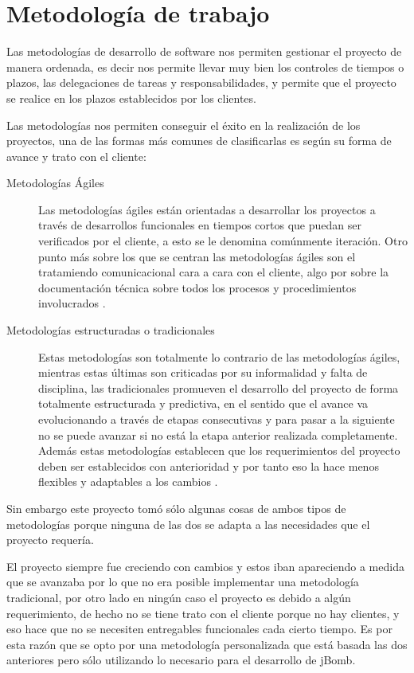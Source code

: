 \documentclass[a4paper,12pt,openany,oneside]{book}
\begin{document}
\chapter{Metodología de trabajo}
Las metodologías de desarrollo de software nos permiten gestionar el proyecto de manera ordenada, es decir nos permite llevar muy bien los controles de tiempos o plazos, las delegaciones de tareas y responsabilidades, y permite que el proyecto se realice en los plazos establecidos por los clientes.

Las metodologías nos permiten conseguir el éxito en la realización de los proyectos, una de las formas más comunes de clasificarlas es según su forma de avance y trato con el cliente:
\begin{description}
\item[Metodologías Ágiles] Las metodologías ágiles están orientadas a desarrollar los proyectos a través de desarrollos funcionales en tiempos cortos que puedan ser verificados por el cliente, a esto se le denomina comúnmente iteración. Otro punto más sobre los que se centran las metodologías ágiles son el tratamiendo comunicacional cara a cara con el cliente, algo por sobre la documentación técnica sobre todos los procesos y procedimientos involucrados \cite{WIKI}.
\item[Metodologías estructuradas o tradicionales] Estas metodologías son totalmente lo contrario de las metodologías ágiles, mientras estas últimas son criticadas por su informalidad y falta de disciplina, las tradicionales promueven el desarrollo del proyecto de forma totalmente estructurada y predictiva, en el sentido que el avance va evolucionando a través de etapas consecutivas y para pasar a la siguiente no se puede avanzar si no está la etapa anterior realizada completamente. Además estas metodologías establecen que los requerimientos del proyecto deben ser establecidos con anterioridad y por tanto eso la hace menos flexibles y adaptables a los cambios \cite{WIKI}.
\end{description}
Sin embargo este proyecto tomó sólo algunas cosas de ambos tipos de metodologías porque ninguna de las dos se adapta a las necesidades que el proyecto requería. 

El proyecto siempre fue creciendo con cambios y estos iban apareciendo a medida que se avanzaba por lo que no era posible implementar una metodología tradicional, por otro lado en ningún caso el proyecto es debido a algún requerimiento, de hecho no se tiene trato con el cliente porque no hay clientes, y eso hace que no se necesiten entregables funcionales cada cierto tiempo. Es por esta razón que se opto por una metodología personalizada que está basada las dos anteriores pero sólo utilizando lo necesario para el desarrollo de jBomb.
\end{document}
